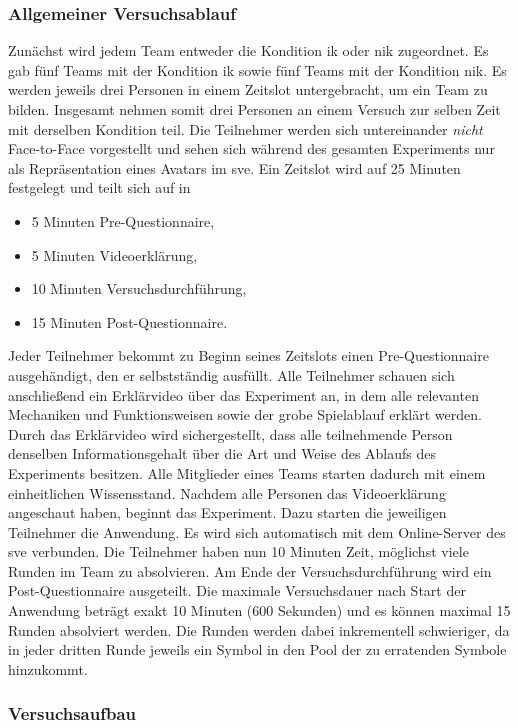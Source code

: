 \documentclass[a4paper,11pt]{article}%
\renewcommand{\\}{\vspace*{0.5\baselineskip} \newline}
\begin{document}
{	\subsubsection{Allgemeiner Versuchsablauf}
Zunächst wird jedem Team entweder die Kondition \ac{ik} oder \ac{nik} zugeordnet. Es gab fünf Teams mit der Kondition \ac{ik} sowie fünf Teams mit der Kondition \ac{nik}.
Es werden jeweils drei Personen in einem Zeitslot untergebracht, um ein Team zu bilden. Insgesamt nehmen somit drei Personen an einem Versuch zur selben Zeit mit derselben Kondition teil. Die Teilnehmer werden sich untereinander \textit{nicht} Face-to-Face vorgestellt und sehen sich während des gesamten Experiments nur als Repräsentation eines Avatars im \ac{sve}. 
Ein Zeitslot wird auf 25 Minuten festgelegt und teilt sich auf in
		\begin{itemize}
			\item 5 Minuten Pre-Questionnaire,
			\item 5 Minuten Videoerklärung,
			\item 10 Minuten Versuchsdurchführung,
			\item 15 Minuten Post-Questionnaire.
		\end{itemize}
Jeder Teilnehmer bekommt zu Beginn seines Zeitslots einen Pre-Questionnaire ausgehändigt, den er selbstständig ausfüllt. Alle Teilnehmer schauen sich anschließend ein Erklärvideo über das Experiment an, in dem alle relevanten Mechaniken und Funktionsweisen sowie der grobe Spielablauf erklärt werden. Durch das Erklärvideo wird sichergestellt, dass alle teilnehmende Person denselben Informationsgehalt  über die Art und Weise des Ablaufs des Experiments besitzen. Alle Mitglieder eines Teams starten dadurch mit einem einheitlichen Wissensstand. Nachdem alle Personen das Videoerklärung angeschaut haben, beginnt das Experiment. Dazu starten die jeweiligen Teilnehmer die Anwendung. Es wird sich automatisch mit dem Online-Server des \ac{sve} verbunden. Die Teilnehmer haben nun 10 Minuten Zeit, möglichst viele Runden im Team zu absolvieren. Am Ende der Versuchsdurchführung wird ein Post-Questionnaire ausgeteilt. Die maximale Versuchsdauer nach Start der Anwendung beträgt exakt 10 Minuten (600 Sekunden) und es können maximal 15 Runden absolviert werden. Die Runden werden dabei inkrementell schwieriger, da in jeder dritten Runde jeweils ein Symbol in den Pool der zu erratenden Symbole hinzukommt.

	\subsubsection{Versuchsaufbau}

}
\end{document}
